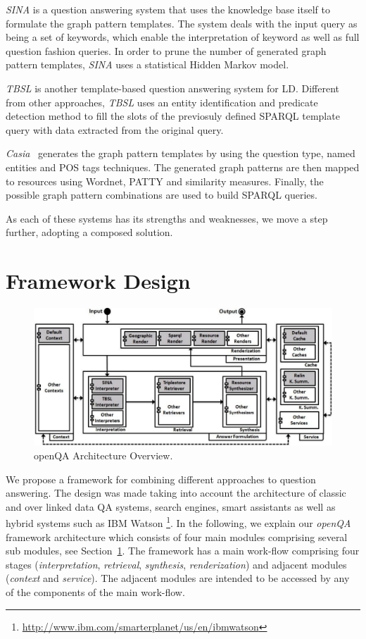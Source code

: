 \emph{SINA} is a question answering system that uses the knowledge base itself to formulate the graph pattern templates.
The system deals with the input query as being a set of keywords, which enable the interpretation of keyword as well as full question fashion queries.
In order to prune the number of generated graph pattern templates, \emph{SINA} uses a statistical Hidden Markov model.

\emph{TBSL} is another template-based question answering system for LD.
Different from other approaches, \emph{TBSL} uses an entity identification and predicate detection method to fill the slots of the previosuly defined SPARQL template query with data extracted from the original query.

\emph{Casia}~\cite{clef2013casia} generates the graph pattern templates by using the question type, named entities and POS tags techniques.
The generated graph patterns are then mapped to resources using Wordnet, PATTY and similarity measures.
Finally, the possible graph pattern combinations are used to build SPARQL queries.

As each of these systems has its strengths and weaknesses, we move a step further, adopting a composed solution.

\section{Framework Design}
\label{chaopenqa:sec:design}

\begin{figure}[bht]
	\centering
	\includegraphics[width=.97\textwidth]{part_03/SEMANTiCS_openQA/images/architecture.pdf}
	\caption{openQA Architecture Overview.}
	\label{chaopenqa:fig:architecture}
	\vspace{-4.0mm}
\end{figure}
We propose a framework for combining different approaches to question answering.
The design was made taking into account the architecture of classic and over linked data QA systems, search engines, smart assistants as well as hybrid systems such as IBM Watson \footnote{\url{http://www.ibm.com/smarterplanet/us/en/ibmwatson}}.
In the following, we explain our \emph{openQA} framework architecture which consists of four main modules comprising several sub modules, see Section~\ref{chaopenqa:fig:architecture}.
The framework has a main work-flow comprising four stages (\emph{interpretation}, \emph{retrieval}, \emph{synthesis},  %
\emph{renderization}) and adjacent modules (\emph{context} and \emph{service}).
The adjacent modules are intended to be accessed by any of the components of the main work-flow.

